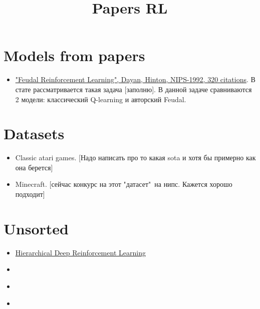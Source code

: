 \documentclass{article}
\title{Papers RL}
\newcommand{\ntt}[1]{{\color{green} [#1]}}
\begin{document}
\maketitle

\section{Models from papers}

\begin{itemize}

    \item \href{https://papers.nips.cc/paper/714-feudal-reinforcement-learning}{"Feudal Reinforcement Learning", Dayan, Hinton, NIPS-1992, 320 citations}. В стате рассматривается такая задача \ntt{заполню}. В данной задаче сравниваются 2 модели: классический Q-learning и авторский Feudal. 
\end{itemize}

\section{Datasets}

\begin{itemize}

    \item  Classic atari games. \ntt{Надо написать про то какая sota и хотя бы примерно как она берется}
    \item Minecraft. \ntt{сейчас конкурс на этот "датасет"\ на нипс. Кажется хорошо подходит}
\end{itemize}

\section{Unsorted}

\begin{itemize}
    \item \href{https://papers.nips.cc/paper/6233-hierarchical-deep-reinforcement-learning-integrating-temporal-abstraction-and-intrinsic-motivation.pdf}{Hierarchical Deep Reinforcement Learning}
    \item \href{}{} 
    \item \href{}{} 
    \item \href{}{}
\end{itemize}
\end{document}

